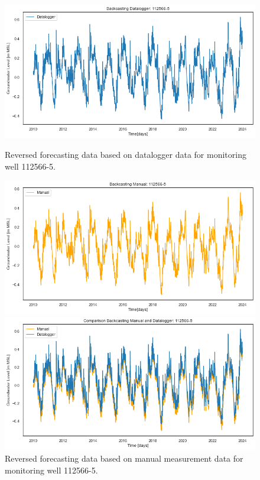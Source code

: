 \begin{figure}[htbp]
    \centering
    \begin{minipage}{0.32\textwidth}
        \centering
        \includegraphics[width=\linewidth]{frontmatter/Rozenburg-fig/Figure 2024-03-12 093200 (180).png}
        \caption{Reversed forecasting data based on datalogger data for monitoring well 112566-5.}
        \label{dl}
    \end{minipage}
    \hfill
    \begin{minipage}{0.32\textwidth}
        \centering
        \includegraphics[width=\linewidth]{frontmatter/Rozenburg-fig/Figure 2024-03-12 093200 (209).png}
        \caption{Reversed forecasting data based on manual measurement data for monitoring well 112566-5.}
        \label{hp}
    \end{minipage}
    \hfill
    \begin{minipage}{0.32\textwidth}
        \centering
        \includegraphics[width=\linewidth]{frontmatter/Rozenburg-fig/Figure 2024-03-12 093200 (238).png}

\end{minipage}
\end{figure}

